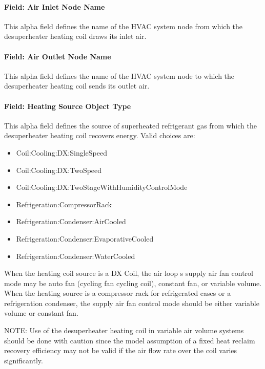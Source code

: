 \paragraph{Field: Air Inlet Node Name}\label{field-air-inlet-node-name-5-000}

This alpha field defines the name of the HVAC system node from which the desuperheater heating coil draws its inlet air.

\paragraph{Field: Air Outlet Node Name}\label{field-air-outlet-node-name-5-000}

This alpha field defines the name of the HVAC system node to which the desuperheater heating coil sends its outlet air.

\paragraph{Field: Heating Source Object Type}\label{field-heating-source-object-type}

This alpha field defines the source of superheated refrigerant gas from which the desuperheater heating coil recovers energy. Valid choices are:

\begin{itemize}
\item
  Coil:Cooling:DX:SingleSpeed
\item
  Coil:Cooling:DX:TwoSpeed
\item
  Coil:Cooling:DX:TwoStageWithHumidityControlMode
\item
  Refrigeration:CompressorRack
\item
  Refrigeration:Condenser:AirCooled
\item
  Refrigeration:Condenser:EvaporativeCooled
\item
  Refrigeration:Condenser:WaterCooled
\end{itemize}

When the heating coil source is a DX Coil, the air loop s supply air fan control mode may be auto fan (cycling fan cycling coil), constant fan, or variable volume. When the heating source is a compressor rack for refrigerated cases or a refrigeration condenser, the supply air fan control mode should be either variable volume or constant fan.

NOTE: Use of the desuperheater heating coil in variable air volume systems should be done with caution since the model assumption of a fixed heat reclaim recovery efficiency may not be valid if the air flow rate over the coil varies significantly.

